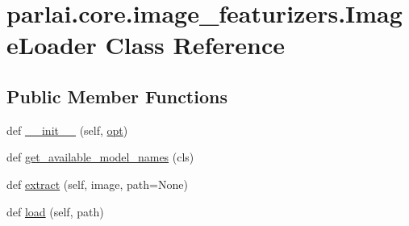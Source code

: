 \hypertarget{classparlai_1_1core_1_1image__featurizers_1_1ImageLoader}{}\section{parlai.\+core.\+image\+\_\+featurizers.\+Image\+Loader Class Reference}
\label{classparlai_1_1core_1_1image__featurizers_1_1ImageLoader}
\subsection*{Public Member Functions}
\begin{DoxyCompactItemize}
\item 
def \hyperlink{classparlai_1_1core_1_1image__featurizers_1_1ImageLoader_a87113f4fbadf8ba2dfea1bc3d3bf63c0}{\+\_\+\+\_\+init\+\_\+\+\_\+} (self, \hyperlink{classparlai_1_1core_1_1image__featurizers_1_1ImageLoader_a66f4cdd0e0498467740ba5caed74a479}{opt})
\item 
def \hyperlink{classparlai_1_1core_1_1image__featurizers_1_1ImageLoader_ae28b5b3cf297bacc15fa563bb3a83dfa}{get\+\_\+available\+\_\+model\+\_\+names} (cls)
\item 
def \hyperlink{classparlai_1_1core_1_1image__featurizers_1_1ImageLoader_a27aff033d71150a78d7e1bd682990258}{extract} (self, image, path=None)
\item 
def \hyperlink{classparlai_1_1core_1_1image__featurizers_1_1ImageLoader_a40f68d29ad49a323cf50e08c6385e39e}{load} (self, path)
\end{DoxyCompactItemize}
